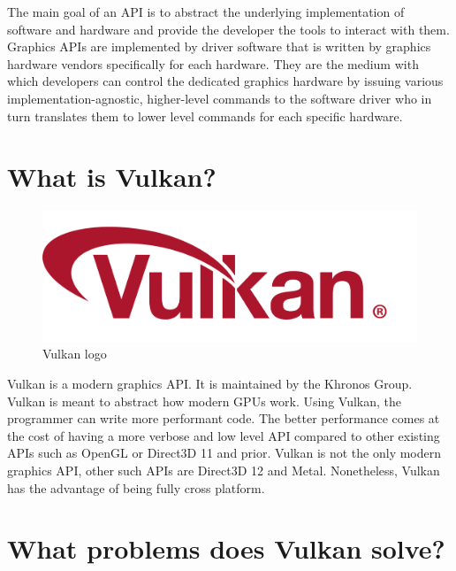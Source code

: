 The main goal of an API is to
abstract the underlying implementation of software and hardware and provide
the developer the tools to interact with them.
Graphics APIs are implemented
by driver software that is written by graphics hardware vendors specifically
for each hardware. They are the medium with which developers can control
the dedicated graphics hardware by issuing various implementation-agnostic,
higher-level commands to the software driver who in turn translates them to
lower level commands for each specific hardware.

\section{What is Vulkan?}

\begin{figure}
    \begin{center}
        \includegraphics[scale=0.10]{images/ChVulkan/VulkanLogo.png}
    \end{center}
    \caption{Vulkan logo}
    \label{fig:VulkanLogo}
\end{figure}

Vulkan is a modern graphics API. It is maintained by the Khronos Group.
Vulkan is meant to abstract how modern GPUs work.
Using Vulkan, the programmer can write more performant code.
The better performance comes at the cost of having a more verbose and low level API compared to
other existing APIs such as OpenGL or Direct3D 11 and prior.
Vulkan is not the only modern graphics API, other such APIs are Direct3D 12 and Metal.
Nonetheless, Vulkan has the advantage of being fully cross platform.

\section{What problems does Vulkan solve?}

